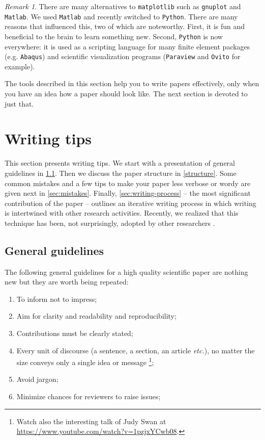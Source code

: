 \documentclass[authoryear,3p,times,preprint,review,fleqn]{elsarticle}
\makeatletter
\newcommand{\etc}{\textit{etc.}\@\xspace}
\numberwithin{equation}{section}
\theoremstyle{remark}
\newtheorem{rmk}{Remark}
\makeatother
\begin{document}
\begin{rmk}\label{rm:a}
There are many alternatives to \texttt{matplotlib} such as \texttt{gnuplot} and \texttt{Matlab}. We used  \texttt{Matlab} and recently switched to \texttt{Python}. There are many reasons that influenced this, two of which are noteworthy. First, it is fun and beneficial to the brain to learn something new. Second, \texttt{Python} is now everywhere: it is used as a scripting language for many finite element packages (e.g. \texttt{Abaqus}) and scientific visualization programs (\texttt{Paraview} and \texttt{Ovito} for example).
\end{rmk}


The tools described in this section help you to write papers effectively, only when you have an idea how a paper should look like. The next section is devoted to just that. 

\section{Writing tips}\label{sec:writing-tips}

This section presents  writing tips. We start with a presentation of general guidelines in \cref{sec:guidelines}. Then we  discuss the paper structure in \cref{structure}. Some common mistakes and a few tips to make your paper less verbose or wordy are given next in 
\cref{sec:mistakes}. Finally, \cref{sec:writing-process} -- the most significant contribution of the paper -- outlines an iterative writing process in which writing is intertwined with other research activities. Recently, we realized that this technique has been, not surprisingly, adopted by other researchers \citep{Jones}.

\subsection{General guidelines}\label{sec:guidelines}

The following general guidelines for a high quality scientific paper are nothing new but they are worth being repeated:

\begin{enumerate}
\item To inform not to impress;
\item Aim for clarity and readability and  reproducibility;
\item Contributions must be clearly stated;
\item Every unit of discourse (a sentence, a section, an article \etc), no matter the size conveys only a single idea or message \citep{gopen1990science}\footnote{Watch also the interesting talk of Judy Swan at \url{https://www.youtube.com/watch?v=1pzjxYCwb08}.};
\item Avoid jargon;%
\item Minimize chances for reviewers to raise issues;
\end{enumerate}
\end{document}
